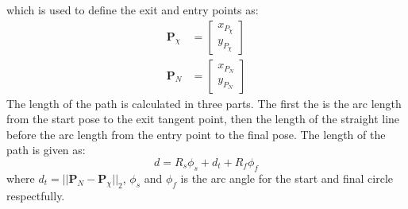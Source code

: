 which is used to define the exit and entry points as:
\begin{subequations}
\begin{align}
\mathbf{P}_{\chi} &= \begin{bmatrix}
x_{P_\chi} \\
y_{P_\chi}
\end{bmatrix} \\
\mathbf{P}_N &= \begin{bmatrix}
x_{P_N} \\
y_{P_N}
\end{bmatrix}
\end{align}
\end{subequations}
The length of the path is calculated in three parts. The first the is the arc length from the start pose to the exit tangent point, then the length of the straight line before the arc length from the entry point to the final pose. The length of the path is given as: 
\begin{equation}
d = R_s\phi_s + d_t + R_f\phi_f
\end{equation}
where $d_t = ||\mathbf{P}_N-\mathbf{P}_{\chi}||_2$, $\phi_s$ and $\phi_f$ is the arc angle for the start and final circle respectfully.

